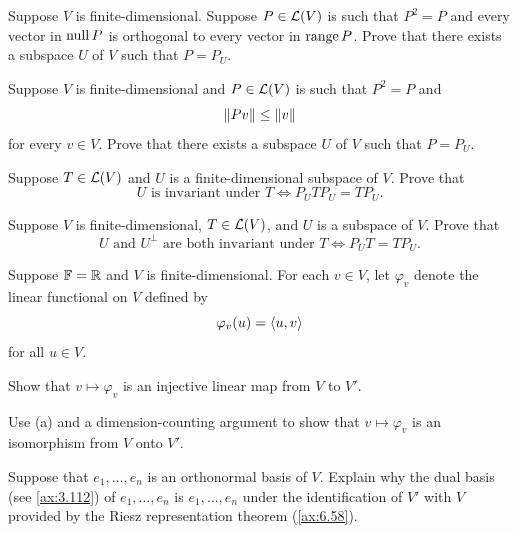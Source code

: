 \begin{exc}
\begin{exercise}
Suppose $V$ is finite-dimensional. Suppose $P\in\mathcal{L}(V)$ is such that $P^2=P$
and every vector in $\operatorname{null} P$ is orthogonal to every vector in $\operatorname{range} P$. Prove
that there exists a subspace $U$ of $V$ such that $P=P_U$.
\end{exercise}

\begin{exercise}
Suppose $V$ is finite-dimensional and $P\in\mathcal{L}(V)$ is such that $P^2=P$ and
\[ \lVert Pv \rVert \le \lVert v \rVert \]
for every $v\in V$. Prove that there exists a subspace $U$ of $V$ such that
$P=P_U$.
\end{exercise}

\begin{exercise}
Suppose $T\in\mathcal{L}(V)$ and $U$ is a finite-dimensional subspace of $V$. Prove
that
\[ U \text{ is invariant under } T \iff P_UTP_U=TP_U. \]
\end{exercise}

\begin{exercise}
Suppose $V$ is finite-dimensional, $T\in\mathcal{L}(V)$, and $U$ is a subspace of $V$.
Prove that
\[ U \text{ and } U^\perp \text{ are both invariant under } T
   \iff P_UT=TP_U. \]
\end{exercise}

\begin{exercise}
Suppose $\mathbb{F}=\mathbb{R}$ and $V$ is finite-dimensional. For each $v\in V$, let
$\varphi_v$ denote the linear functional on $V$ defined by
\[ \varphi_v(u) = \langle u, v \rangle \]
for all $u\in V$.
\begin{parts}
\item Show that $v\mapsto\varphi_v$ is an injective linear map from $V$ to
  $V'$.
\item Use (a) and a dimension-counting argument to show that
  $v\mapsto\varphi_v$ is an isomorphism from $V$ onto $V'$.
\end{parts}
\end{exercise}

\begin{exercise}
Suppose that $e_1,\dots,e_n$ is an orthonormal basis of $V$. Explain why the
dual basis (see \ref{ax:3.112}) of $e_1,\dots,e_n$ is $e_1,\dots,e_n$ under the
identification of $V'$ with $V$ provided by the Riesz representation theorem
(\ref{ax:6.58}).
\end{exercise}


\end{exc}
